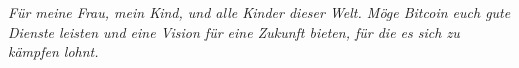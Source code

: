 
\newpage \vspace*{6cm}
\thispagestyle{empty}
\begin{center}
  \Large \emph{
  Für meine Frau, mein Kind, und alle Kinder dieser Welt. Möge Bitcoin euch gute
  Dienste leisten und eine Vision für eine Zukunft bieten, für die es sich zu
  kämpfen lohnt.
  }
\end{center}
